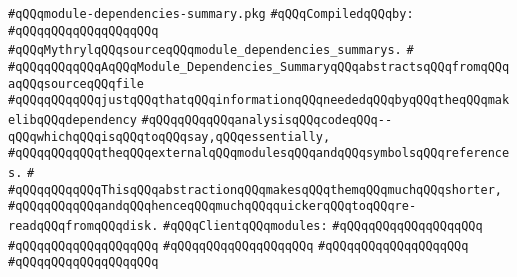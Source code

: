 \label{src/app/makelib/compilable/module-dependencies-summary.pkg}
\verb|#qQQqmodule-dependencies-summary.pkg|\newline
\newline
\verb|#qQQqCompiledqQQqby:|\newline
\verb|#qQQqqQQqqQQqqQQqqQQq|\newline
\newline
\verb|#qQQqMythrylqQQqsourceqQQqmodule_dependencies_summarys.|\newline
\verb|#|\newline
\verb|#qQQqqQQqqQQqAqQQqModule_Dependencies_SummaryqQQqabstractsqQQqfromqQQqaqQQqsourceqQQqfile|\newline
\verb|#qQQqqQQqqQQqjustqQQqthatqQQqinformationqQQqneededqQQqbyqQQqtheqQQqmakelibqQQqdependency|\newline
\verb|#qQQqqQQqqQQqanalysisqQQqcodeqQQq--qQQqwhichqQQqisqQQqtoqQQqsay,qQQqessentially,|\newline
\verb|#qQQqqQQqqQQqtheqQQqexternalqQQqmodulesqQQqandqQQqsymbolsqQQqreferences.|\newline
\verb|#|\newline
\verb|#qQQqqQQqqQQqThisqQQqabstractionqQQqmakesqQQqthemqQQqmuchqQQqshorter,|\newline
\verb|#qQQqqQQqqQQqandqQQqhenceqQQqmuchqQQqquickerqQQqtoqQQqre-readqQQqfromqQQqdisk.|\newline
\newline
\verb|#qQQqClientqQQqmodules:|\newline
\verb|#qQQqqQQqqQQqqQQqqQQq|\newline
\verb|#qQQqqQQqqQQqqQQqqQQq|\newline
\verb|#qQQqqQQqqQQqqQQqqQQq|\newline
\verb|#qQQqqQQqqQQqqQQqqQQq|\newline
\verb|#qQQqqQQqqQQqqQQqqQQq|\newline
